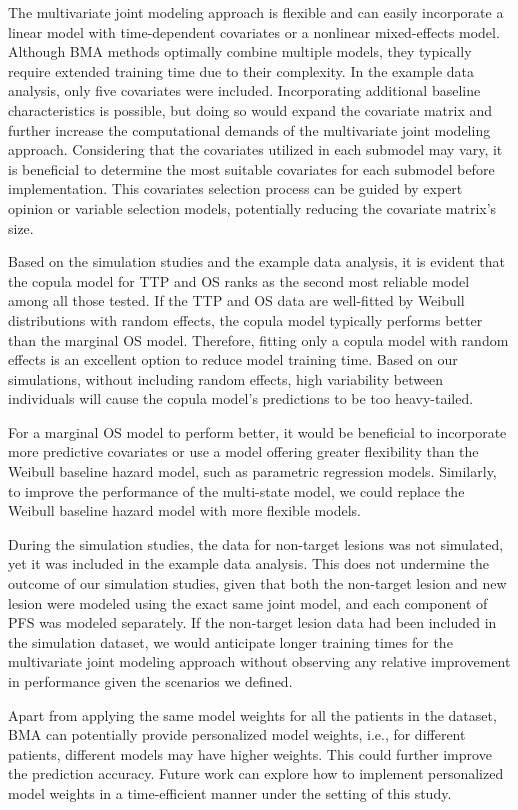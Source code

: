 The multivariate joint modeling approach is flexible and can easily incorporate a linear model with time-dependent covariates or a nonlinear mixed-effects model. Although \ac{BMA} methods optimally combine multiple models, they typically require extended training time due to their complexity. In the example data analysis, only five covariates were included. Incorporating additional baseline characteristics is possible, but doing so would expand the covariate matrix and further increase the computational demands of the multivariate joint modeling approach. Considering that the covariates utilized in each submodel may vary, it is beneficial to determine the most suitable covariates for each submodel before implementation. This covariates selection process can be guided by expert opinion or variable selection models, potentially reducing the covariate matrix's size.

Based on the simulation studies and the example data analysis, it is evident that the copula model for \ac{TTP} and \ac{OS} ranks as the second most reliable model among all those tested. If the \ac{TTP} and \ac{OS} data are well-fitted by Weibull distributions with random effects, the copula model typically performs better than the marginal \ac{OS} model. Therefore, fitting only a copula model with random effects is an excellent option to reduce model training time. Based on our simulations, without including random effects, high variability between individuals will cause the copula model's predictions to be too heavy-tailed.

For a marginal \ac{OS} model to perform better, it would be beneficial to incorporate more predictive covariates or use a model offering greater flexibility than the Weibull baseline hazard model, such as parametric regression models. Similarly, to improve the performance of the multi-state model, we could replace the Weibull baseline hazard model with more flexible models.

During the simulation studies, the data for non-target lesions was not simulated, yet it was included in the example data analysis. This does not undermine the outcome of our simulation studies, given that both the non-target lesion and new lesion were modeled using the exact same joint model, and each component of \ac{PFS} was modeled separately. If the non-target lesion data had been included in the simulation dataset, we would anticipate longer training times for the multivariate joint modeling approach without observing any relative improvement in performance given the scenarios we defined.

Apart from applying the same model weights for all the patients in the dataset, \ac{BMA} can potentially provide personalized model weights, i.e., for different patients, different models may have higher weights. This could further improve the prediction accuracy. Future work can explore how to implement personalized model weights in a time-efficient manner under the setting of this study.